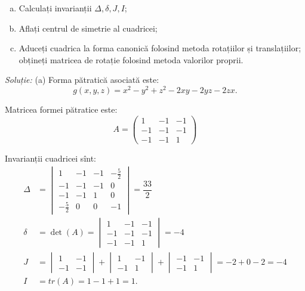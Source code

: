 \begin{enumerate}[(a)]
	\item Calculați invarianții $\Delta, \delta, J, I$;
	\item Aflați centrul de simetrie al cuadricei;
	\item Aduceți cuadrica la forma canonică folosind metoda rotațiilor și
translațiilor; obțineți matricea de rotație folosind metoda valorilor proprii.
\end{enumerate}

\emph{Soluție:}
(a)	Forma pătratică asociată este: 
 \[
	g(x, y, z) = x^2 - y^2 + z^2 - 2xy - 2yz - 2zx.
\]

Matricea formei pătratice este: 
 \[
	A = \begin{pmatrix}
	        1 & -1 & -1 \\
	        -1 & -1 & -1 \\
	        -1 & -1 & 1
        \end{pmatrix}
\]

Invarianții cuadricei sînt:
\begin{align*}
	\Delta &= \begin{vmatrix}
	             1 & -1 & -1 & -\frac{5}{2} \\
	             -1 & -1 & -1 & 0 \\
	             -1 & -1 & 1 & 0 \\
	             - \frac{5}{2} & 0 & 0 & -1
             \end{vmatrix} = \dfrac{33}{2} \\
    \delta &= \det(A) = \begin{vmatrix}
	                        1 & -1 & -1 \\
	                        -1 & -1 & -1 \\
	                        -1 & -1 & 1
                        \end{vmatrix} = -4 \\
    J &= \begin{vmatrix}
	         1 & -1 \\
	         -1 & -1
         \end{vmatrix} +
         \begin{vmatrix}
	         1 & -1 \\
	         -1 & 1
         \end{vmatrix} +
         \begin{vmatrix}
	         -1 & -1 \\
	         -1 & 1
         \end{vmatrix} = 
         -2 + 0 - 2 = -4 \\
    I &= tr(A) = 1 - 1 + 1 = 1.
\end{align*}

